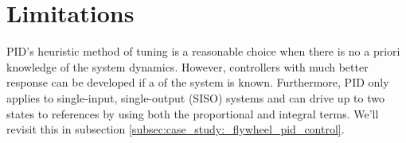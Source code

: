 \section{Limitations}

PID's heuristic method of tuning is a reasonable choice when there is no a
priori knowledge of the \gls{system} dynamics. However, controllers with much
better response can be developed if a  of the
\gls{system} is known. Furthermore, PID only applies to single-input,
single-output (SISO) \glspl{system} and can drive up to two \glspl{state} to
\glspl{reference} by using both the proportional and integral terms. We'll
revisit this in subsection \ref{subsec:case_study:_flywheel_pid_control}.

